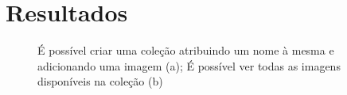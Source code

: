 \documentclass{report}
\begin{document}
\chapter{Resultados}
\label{chap.resultados}

\begin{figure}[H]
    \centering
    \qquad
    \caption{É possível criar uma coleção atribuindo um nome à mesma e adicionando uma imagem (a); É possível ver todas as imagens disponíveis na coleção (b)}
    \label{fig:resultados1}
\end{figure}
\end{document}
